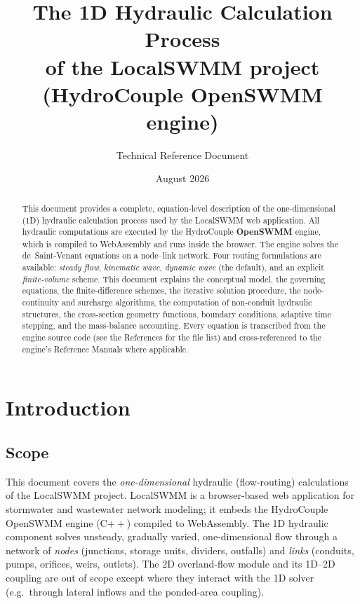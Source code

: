 \documentclass[11pt,a4paper]{article}
\title{\textbf{The 1D Hydraulic Calculation Process}\\[0.6em]
\large of the LocalSWMM project (HydroCouple OpenSWMM engine)}
\author{Technical Reference Document}
\date{August 2026}
\begin{document}
\maketitle

\begin{abstract}
This document provides a complete, equation-level description of the
one-dimensional (1D) hydraulic calculation process used by the LocalSWMM web
application. All hydraulic computations are executed by the HydroCouple
\textbf{OpenSWMM} engine, which is compiled to WebAssembly and runs inside the
browser. The engine solves the de~Saint-Venant equations on a node--link
network. Four routing formulations are available: \emph{steady flow},
\emph{kinematic wave}, \emph{dynamic wave} (the default), and an explicit
\emph{finite-volume} scheme. This document explains the conceptual model, the
governing equations, the finite-difference schemes, the iterative solution
procedure, the node-continuity and surcharge algorithms, the computation of
non-conduit hydraulic structures, the cross-section geometry functions,
boundary conditions, adaptive time stepping, and the mass-balance accounting.
Every equation is transcribed from the engine source code (see the
References for the file list) and cross-referenced to the engine's Reference
Manuals where applicable.
\end{abstract}

\tableofcontents
\newpage

\section{Introduction}

\subsection{Scope}

This document covers the \emph{one-dimensional} hydraulic (flow-routing)
calculations of the LocalSWMM project. LocalSWMM is a browser-based web
application for stormwater and wastewater network modeling; it embeds the
HydroCouple OpenSWMM engine (C$++$) compiled to WebAssembly. The 1D hydraulic
component solves unsteady, gradually varied, one-dimensional flow through a
network of \emph{nodes} (junctions, storage units, dividers, outfalls) and
\emph{links} (conduits, pumps, orifices, weirs, outlets). The 2D overland-flow
module and its 1D--2D coupling are out of scope except where they interact with
the 1D solver (e.g.\ through lateral inflows and the ponded-area coupling).
\end{document}
